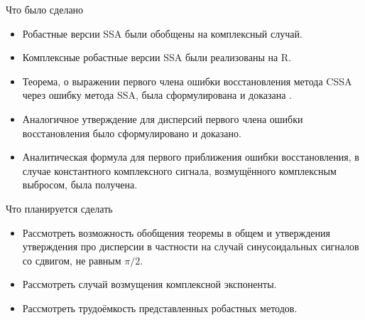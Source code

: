 \documentclass[ucs, notheorems, handout]{beamer}
\begin{document}
\begin{frame}{Что было сделано}
    \begin{itemize}
        \item Робастные версии SSA были обобщены на комплексный случай.
        \item Комплексные робастные версии SSA были реализованы на R.
        \item Теорема, о выражении первого члена ошибки восстановления метода CSSA через ошибку метода SSA, была сформулирована и доказана .
        \item Аналогичное утверждение для дисперсий первого члена ошибки восстановления было сформулировано и доказано.
        \item Аналитическая формула для первого приближения ошибки восстановления, в случае константного комплексного сигнала, возмущённого комплексным выбросом, была получена.  
    \end{itemize}
\end{frame}

\begin{frame}{Что планируется сделать}
    \begin{itemize}
        \item Рассмотреть возможность обобщения теоремы в общем и утверждения утверждения про дисперсии в частности на случай синусоидальных сигналов со сдвигом, не равным $\pi / 2$.
        \item Рассмотреть случай возмущения комплексной экспоненты.
        \item Рассмотреть трудоёмкость представленных робастных методов.
    \end{itemize}
\end{frame}
\end{document}
